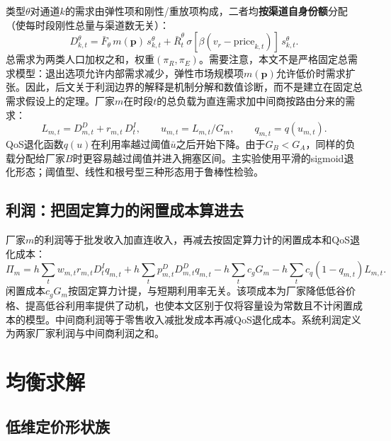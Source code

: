 \documentclass[UTF8,11pt]{ctexart}
\newcommand{\qos}{q}
\newcommand{\D}{D}
\newcommand{\p}{\boldsymbol{p}}
\begin{document}
类型$\theta$对通道$k$的需求由弹性项和刚性/重放项构成，二者均\textbf{按渠道自身份额}分配（使每时段刚性总量与渠道数无关）：
\begin{equation}
  \D^\theta_{k,t}=\bar F_\theta\,m(\p)\,s^\theta_{k,t}
  +\bar R^\theta_t\,\sigma[\beta(v_r-\text{price}_{k,t})]\,s^\theta_{k,t}.
  \label{eq:demand}
\end{equation}
总需求为两类人口加权之和，权重$(\pi_R,\pi_E)$。需要注意，本文不是严格固定总需求模型：退出选项允许内部需求减少，弹性市场规模项$m(\p)$允许低价时需求扩张。因此，后文关于利润边界的解释是机制分解和数值诊断，而不是建立在固定总需求假设上的定理。厂家$m$在时段$t$的总负载为直连需求加中间商按路由分来的需求：
\begin{equation}
  L_{m,t}=\D^D_{m,t}+r_{m,t}\,\D^I_t,\qquad u_{m,t}=L_{m,t}/G_m,\qquad q_{m,t}=\qos(u_{m,t}).
  \label{eq:load}
\end{equation}
QoS退化函数$\qos(u)$在利用率越过阈值$\bar u$之后开始下降。由于$G_B<G_A$，同样的负载分配给厂家$B$时更容易越过阈值并进入拥塞区间。主实验使用平滑的sigmoid退化形态；阈值型、线性和根号型三种形态用于鲁棒性检验。

\subsection{利润：把固定算力的闲置成本算进去}

厂家$m$的利润等于批发收入加直连收入，再减去按固定算力计的闲置成本和QoS退化成本：
\begin{equation}
  \Pi_m=h\!\sum_t\! w_{m,t}r_{m,t}\D^I_t q_{m,t}
  +h\!\sum_t\! p^D_{m,t}\D^D_{m,t}q_{m,t}
  -h\!\sum_t\! c_g G_m
  -h\!\sum_t\! c_q(1-q_{m,t})L_{m,t}.
  \label{eq:firm_profit}
\end{equation}
闲置成本$c_g G_m$按固定算力计提，与短期利用率无关。该项成本为厂家降低低谷价格、提高低谷利用率提供了动机，也使本文区别于仅将容量设为常数且不计闲置成本的模型。中间商利润等于零售收入减批发成本再减QoS退化成本。系统利润定义为两家厂家利润与中间商利润之和。


\section{均衡求解}
\label{sec:solver}

\subsection{低维定价形状族}
\end{document}
